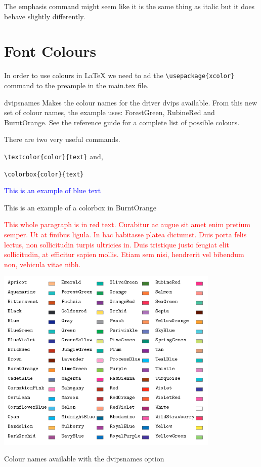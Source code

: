 \vspace{0.4cm}

The emphasis command might seem like it is the same thing as italic but it does behave slightly differently. 

\newpage

\section{Font Colours}

In order to use colours in LaTeX we need to ad the \verb|\usepackage{xcolor}| command to the preample in the main.tex file. 

dvipsnames Makes the colour names for the driver dvips available. From this new set of colour names, the example uses: ForestGreen, RubineRed and BurntOrange. See the reference guide for a complete list of possible colours.

There are two very useful commands. 

\verb|\textcolor{color}{text}| and, 

\verb|\colorbox{color}{text}|

\textcolor{blue}{This is an example of blue text}

\colorbox{BurntOrange}{This is an example of a colorbox in BurntOrange}

\textcolor{red}{This whole paragraph is in red text. Curabitur ac augue sit amet enim pretium semper. Ut at finibus ligula. In hac habitasse platea dictumst. Duis porta felis lectus, non sollicitudin turpis ultricies in. Duis tristique justo feugiat elit sollicitudin, at efficitur sapien mollis. Etiam sem nisi, hendrerit vel bibendum non, vehicula vitae nibh.}

\vspace{0.4cm}

\begin{center}

\includegraphics[width=0.8\textwidth]{images/ColoursEx6.png}

\scriptsize{Colour names available with the dvipsnames option}

\end{center}

